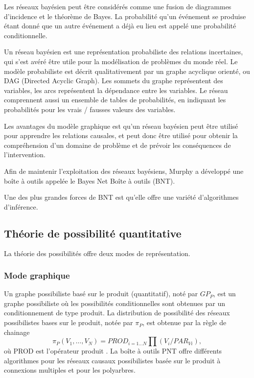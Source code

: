 Les réseaux bayésien peut être considérés comme une fusion de diagrammes d'incidence et le théorème de Bayes. La probabilité qu'un événement se produise étant donné que un autre événement a déjà eu lieu est appelé une probabilité conditionnelle. 

Un réseau bayésien est une représentation probabiliste des relations incertaines, qui s'est avéré être utile pour la modélisation de problèmes du monde réel. Le modèle probabiliste est décrit qualitativement par un graphe acyclique orienté, ou DAG (Directed Acyclic Graph). Les sommets du graphe représentent des variables, les arcs représentent la dépendance entre les variables. Le réseau comprennent aussi un ensemble de tables de probabilités, en indiquant les probabilités pour les vrais / fausses valeurs des variables.

Les avantages du  modèle graphique est qu’un réseau bayésien peut être utilisé pour apprendre les relations causales, et peut donc être utilisé pour obtenir la compréhension d'un domaine de problème et de prévoir les conséquences de l'intervention.

Afin de maintenir l'exploitation des réseaux bayésiens, Murphy a développé une boîte à outils appelée le Bayes Net Boîte à outils (BNT).

Une des plus grandes forces de BNT \cite{BNT} est qu'elle offre une variété d'algorithmes d'inférence.


\subsection{Théorie de possibilité quantitative}

La théorie des possibilités offre deux modes de représentation.

\subsubsection{Mode graphique}

Un graphe possibiliste basé sur le produit (quantitatif), noté par $GP_{P}$, est un graphe possibiliste où les possibilités conditionnelles sont obtenues par un conditionnement de type produit. La distribution de possibilité des réseaux possibilistes bases sur le produit, notée par $\pi_{P}$, est obtenue par la règle de chainage 
\begin{equation}
\pi_{P} (V_1, \dots , V_N) = PROD_{i=1 \dots N} \prod  (V_i/PAR_{Vi}),
\end{equation}
où PROD est l’opérateur produit \cite{BoBrDu2008.1}.
La boîte à outils PNT offre  différents algorithmes pour les réseaux causaux possibilistes basée sur le produit à connexions multiples et pour les polyarbres. 
